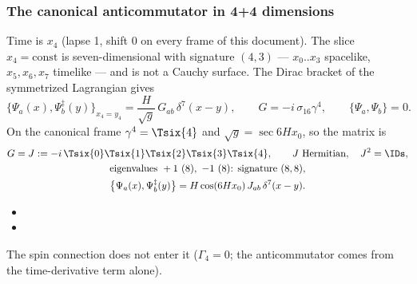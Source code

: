 \subsubsection{The canonical anticommutator in 4+4 dimensions}
\label{sec:4.1.4}

Time is $x_4$ (lapse 1, shift 0 on every frame of this document). The slice $x_4=\text{const}$ is
seven-dimensional with signature $(4,3)$ --- $x_0..x_3$ spacelike, $x_5,x_6,x_7$ timelike --- and is
not a Cauchy surface. The Dirac bracket of the symmetrized Lagrangian gives
\[
  \bigl\{\Psi_a(x),\Psi^{\ddagger}_b(y)\bigr\}_{x_4=y_4}=\frac{H}{\sqrt g}\,G_{ab}\,\delta^7(x-y),\qquad
  G=-i\,\sigma_{16}\gamma^4,\qquad \{\Psi_a,\Psi_b\}=0 .
\]
On the canonical frame $\gamma^4=\Tsix{4}$ and $\sqrt g=\sec 6Hx_0$, so the matrix is
\begin{gather*}
  G=J:=-i\,\Tsix{0}\Tsix{1}\Tsix{2}\Tsix{3}\Tsix{4},\qquad J\ \text{Hermitian},\quad J^2=\IDs,\\
  \text{eigenvalues }+1\ (8),\ -1\ (8)\text{: signature }(8,8),\\
  \bigl\{\Psi_a(x),\Psi^{\ddagger}_b(y)\bigr\}=H\cos(6Hx_0)\,J_{ab}\,\delta^7(x-y).
\end{gather*}
\begin{itemize}
  \item {}
  \item {}
\end{itemize}
The spin connection does not enter it ($\Gamma_4=0$; the anticommutator comes from the time-derivative
term alone).

